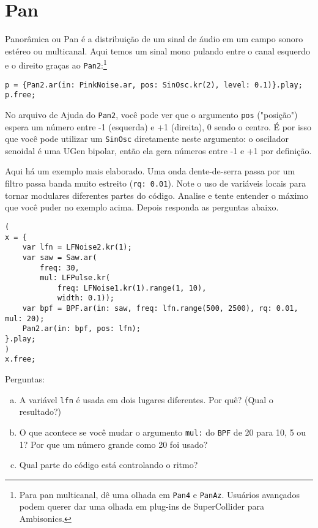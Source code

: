 \section{Pan}

Panorâmica ou Pan é a distribuição de um sinal de áudio em um campo sonoro estéreo ou multicanal. Aqui temos um sinal mono pulando entre o canal esquerdo e o direito graças ao \texttt{Pan2}:\footnote{Para pan multicanal, dê uma olhada em \texttt{Pan4} e \texttt{PanAz}. Usuários avançados podem querer dar uma olhada em plug-ins de SuperCollider para Ambisonics.}
\begin{lstlisting}[style=SuperCollider-IDE, basicstyle=\scttfamily\footnotesize]
p = {Pan2.ar(in: PinkNoise.ar, pos: SinOsc.kr(2), level: 0.1)}.play;
p.free;
\end{lstlisting}
No arquivo de Ajuda do \texttt{Pan2}, você pode ver que o argumento \texttt{pos} ("posição") espera um número entre -1 (esquerda) e +1 (direita), 0 sendo o centro. É por isso que você pode utilizar um \texttt{SinOsc} diretamente neste argumento: o oscilador senoidal é uma UGen bipolar, então ela gera números entre -1 e +1 por definição.

Aqui há um exemplo mais elaborado. Uma onda dente-de-serra passa por um filtro passa banda muito estreito (\texttt{rq: 0.01}). Note o uso de variáveis locais para tornar modulares diferentes partes do código. Analise e tente entender o máximo que você puder no exemplo acima. Depois responda as perguntas abaixo.

\begin{lstlisting}[style=SuperCollider-IDE, basicstyle=\scttfamily\footnotesize]
(
x = {
	var lfn = LFNoise2.kr(1);
	var saw = Saw.ar(
		freq: 30, 
		mul: LFPulse.kr(
			freq: LFNoise1.kr(1).range(1, 10),
			width: 0.1));
	var bpf = BPF.ar(in: saw, freq: lfn.range(500, 2500), rq: 0.01, mul: 20);
	Pan2.ar(in: bpf, pos: lfn);
}.play;
)
x.free;
\end{lstlisting}
 
Perguntas:
\begin{enumerate}[(a)]
\item A variável \texttt{lfn} é usada em dois lugares diferentes. Por quê? (Qual o resultado?)
\item O que acontece se você mudar o argumento \texttt{mul:} do \texttt{BPF} de 20 para 10, 5 ou 1? Por que um número grande como 20 foi usado?
\item Qual parte do código está controlando o ritmo?
\end{enumerate}

